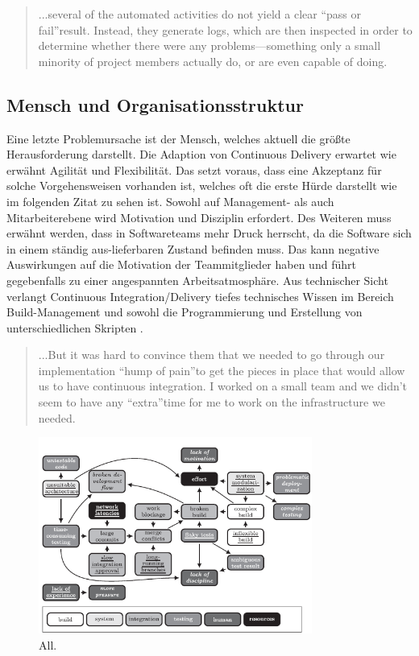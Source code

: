 \begin{quote}\glqq ...several of the automated activities do not yield a clear “pass or fail”result. Instead, they generate logs, which are then inspected in order to determine whether there were any problems—something only a small minority of project members actually do, or are even capable of doing. \grqq~\cite[S.65]{Laukkanen.2017}\end{quote}
%

\subsection{Mensch und Organisationsstruktur}
Eine letzte Problemursache ist der Mensch, welches aktuell die größte Herausforderung darstellt. Die Adaption von Continuous Delivery erwartet wie erwähnt Agilität und Flexibilität. Das setzt voraus, dass eine Akzeptanz für solche Vorgehensweisen vorhanden ist, welches oft die erste Hürde darstellt wie im folgenden Zitat zu sehen ist. Sowohl auf Management- als auch Mitarbeiterebene wird Motivation und Disziplin erfordert. Des Weiteren muss erwähnt werden, dass in Softwareteams mehr Druck herrscht, da die Software sich in einem ständig aus-lieferbaren Zustand befinden muss. Das kann negative Auswirkungen auf die Motivation der Teammitglieder haben und führt gegebenfalls zu einer angespannten Arbeitsatmosphäre. Aus technischer Sicht verlangt Continuous Integration/Delivery tiefes technisches Wissen im Bereich Build-Management und sowohl die Programmierung und Erstellung von unterschiedlichen Skripten \cite{Laukkanen.2017}. 

\begin{quote}\glqq ...But it was hard to convince them that we needed to go through our implementation “hump of pain”to get the pieces in place that would allow us to have continuous integration. I worked on a small team and we didn’t seem to have any “extra”time for me to work on the infrastructure we needed. \grqq~\cite[S.373]{Stolberg.2009} \end{quote}
%

\begin{figure}[ht]
	\centering
	\includegraphics[width=0.8\textwidth,]{images/all}
	\caption{All\cite{Laukkanen.2017}.}
	\label{integrationsprobleme}
\end{figure}